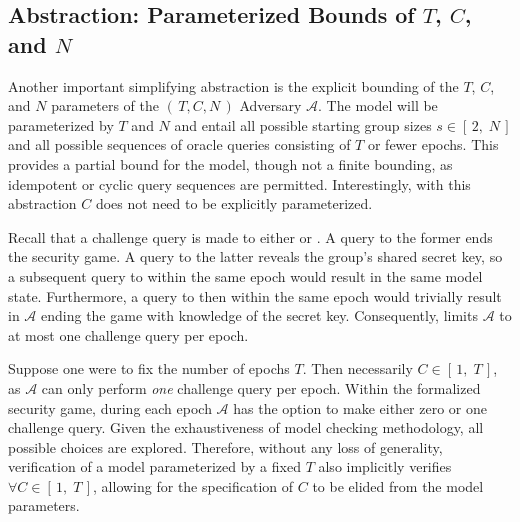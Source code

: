 \documentclass[runningheads]{llncs}
\newcommand{\Adversary}{\ensuremath{\mathcal{A}}\xspace}
\newcommand{\NumericRange}[2]{\ensuremath{\left[\,#1,\; #2\,\right]}\xspace}
\begin{document}

\subsection{Abstraction: Parameterized Bounds of $T$, $C$, and $N$}

Another important simplifying abstraction is the explicit bounding of the $T$, $C$, and $N$ parameters of the \((\,T, C, N\,)\) Adversary \Adversary.
The model will be parameterized by $T$ and $N$ and entail all possible starting group sizes $s \in \NumericRange{2}{N}$ and all possible sequences of oracle queries consisting of $T$ or fewer epochs.
This provides a partial bound for the model, though not a finite bounding, as idempotent or cyclic query sequences are permitted.
Interestingly, with this abstraction $C$ does not need to be explicitly parameterized.

Recall that a challenge query is made to either  or .
A query to the former ends the security game.
A query to the latter reveals the group's shared secret key, so a subsequent query to  within the same epoch would result in the same model state.
Furthermore, a query to  then  within the same epoch would trivially result in \Adversary ending the game with knowledge of the secret key.
Consequently, \CGKAsec limits \Adversary to at most one challenge query per epoch.

Suppose one were to fix the number of epochs $T$.
Then necessarily $C \in \NumericRange{1}{T}$, as \Adversary can only perform \emph{one} challenge query per epoch.
Within the formalized security game, during each epoch \Adversary has the option to make either zero or one challenge query.
Given the exhaustiveness of model checking methodology, all possible choices are explored.
Therefore, without any loss of generality, verification of a model parameterized by a fixed $T$ also implicitly verifies $\forall C \in \NumericRange{1}{T}$, allowing for the specification of $C$ to be elided from the model parameters.
\end{document}

